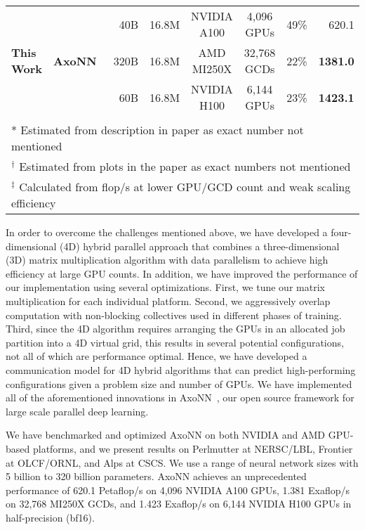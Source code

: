 \begin{table*}[t]
\begin{tabular}{lcrrccrr}
		\midrule
		\multirow{3}{*}{\bf This Work}         & \multirow{3}{*}{\textbf{AxoNN}~\cite{singh:ipdps2022}} & 40B & 16.8M & NVIDIA A100 & 4,096 GPUs & 49\% & 620.1\\
		& & 320B & 16.8M & AMD MI250X  & 32,768 GCDs & 22\% & \textbf{1381.0} \\
		& & 60B  & 16.8M & NVIDIA H100 & 6,144 GPUs  & 23\% & \textbf{1423.1} \\
		\bottomrule
		\vspace{-0.5em}\\
		\multicolumn{8}{l}{\small{* Estimated from description in paper as exact number not mentioned}}\\
		\multicolumn{8}{l}{\small{$^{\dagger}$ Estimated from plots in the paper as exact numbers not mentioned}}\\
		\multicolumn{8}{l}{\small{$^{\ddagger}$ Calculated from flop/s at lower GPU/GCD count and weak scaling efficiency}}\\
	\end{tabular}
    \label{tab:study-comparison}
\end{table*}

In order to overcome the challenges mentioned above, we have developed a
four-dimensional (4D) hybrid parallel approach that combines a
three-dimensional (3D) matrix multiplication algorithm with data parallelism to
achieve high efficiency at large GPU counts. In addition, we have improved the
performance of our implementation using several optimizations.  First, we tune
our matrix multiplication for each individual platform. Second, we aggressively
overlap computation with non-blocking collectives used in different phases of
training. Third, since the 4D algorithm requires arranging the GPUs in an
allocated job partition into a 4D virtual grid, this results in several
potential configurations, not all of which are performance optimal. Hence, we
have developed a communication model for 4D hybrid algorithms that can predict
high-performing configurations given a problem size and number of GPUs. We have implemented 
all of the aforementioned innovations in AxoNN~\cite{singh:ipdps2022, singh:ipdps2023}, our open source 
framework for large scale parallel deep learning.

We have benchmarked and optimized AxoNN on both NVIDIA and AMD GPU-based
platforms, and we present results on Perlmutter at NERSC/LBL, Frontier at
OLCF/ORNL, and Alps at CSCS. We use a range of neural network sizes with 5
billion to 320 billion parameters. AxoNN achieves an unprecedented performance
of 620.1 Petaflop/s on 4,096 NVIDIA A100 GPUs, 1.381 Exaflop/s on 32,768 MI250X
GCDs, and 1.423 Exaflop/s on 6,144 NVIDIA H100 GPUs in half-precision (bf16).

